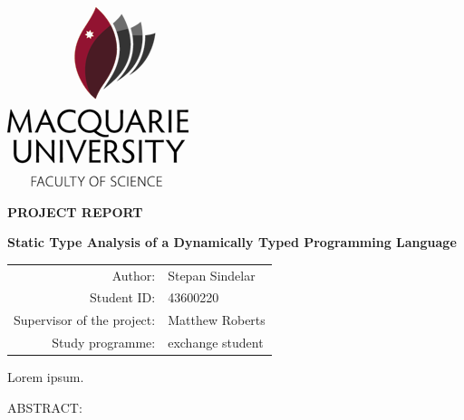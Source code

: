 \documentclass[12pt,a4paper]{report}
\begin{document}
\newcommand{\wthesis}[0]{report}
\newcommand{\wThesis}[0]{Report}

\newcommand{\wchapter}[0]{section}
\newcommand{\wChapter}[0]{Section}

\newcommand{\wsection}[0]{paragraph}
\newcommand{\wSection}[0]{Paragraph}



\pagestyle{empty}
\begin{center}

\vfill

\centerline{\mbox{\includegraphics{img/mq-logo.png}}}

\vspace{2cm}

{\bf\Large PROJECT REPORT}

\vfill

{\LARGE\bfseries Static Type Analysis of a Dynamically Typed
Programming Language}

\vfill

\begin{tabular}{rl}
Author: & Stepan Sindelar \\
\noalign{\vspace{2mm}}
Student ID: & 43600220 \\
\noalign{\vspace{2mm}}
Supervisor of the project: &  Matthew Roberts \\
\noalign{\vspace{2mm}}
Study programme: & exchange student \\
\end{tabular}

\vfill

\end{center}

\newpage
\noindent
Lorem ipsum.

\newpage
\vspace{3cm}
\begin{center}
ABSTRACT:
\end{center}
\end{document}
